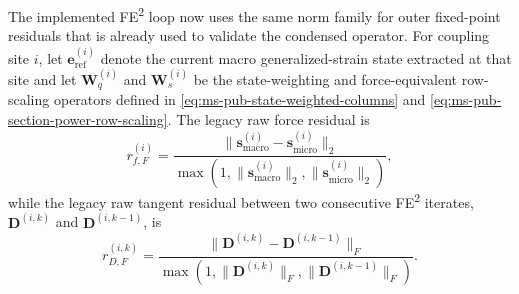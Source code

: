 The implemented FE\textsuperscript{2} loop now uses the same norm family for
outer fixed-point residuals that is already used to validate the condensed
operator.  For coupling site \(i\), let
\(\mathbf{e}_{\mathrm{ref}}^{(i)}\) denote the current macro generalized-strain
state extracted at that site and let \(\mathbf{W}_q^{(i)}\) and
\(\mathbf{W}_s^{(i)}\) be the state-weighting and force-equivalent row-scaling
operators defined in \eqref{eq:ms-pub-state-weighted-columns} and
\eqref{eq:ms-pub-section-power-row-scaling}.  The legacy raw force residual is
\begin{equation}
  r_{f,F}^{(i)}
  =
  \frac{\lVert \mathbf{s}_{\text{macro}}^{(i)}
  - \mathbf{s}_{\text{micro}}^{(i)} \rVert_2}
  {\max\!\left(1,
    \lVert \mathbf{s}_{\text{macro}}^{(i)} \rVert_2,
    \lVert \mathbf{s}_{\text{micro}}^{(i)} \rVert_2\right)},
  \label{eq:ms-pub-force-residual-raw}
\end{equation}
while the legacy raw tangent residual between two consecutive FE\textsuperscript{2}
iterates, \(\mathbf{D}^{(i,k)}\) and \(\mathbf{D}^{(i,k-1)}\), is
\begin{equation}
  r_{D,F}^{(i,k)}
  =
  \frac{\lVert \mathbf{D}^{(i,k)} - \mathbf{D}^{(i,k-1)} \rVert_F}
  {\max\!\left(1,
    \lVert \mathbf{D}^{(i,k)} \rVert_F,
    \lVert \mathbf{D}^{(i,k-1)} \rVert_F\right)}.
  \label{eq:ms-pub-tangent-residual-raw}
\end{equation}

